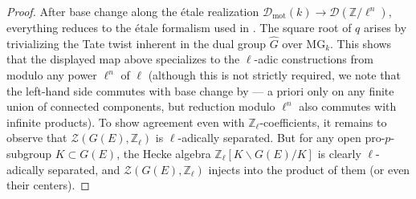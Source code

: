 \documentclass[11pt]{amsart}
\numberwithin{equation}{section}
\numberwithin{theorem}{section}
\theoremstyle{definition}
\begin{document}
\begin{proof}
After base change along the \'etale realization $\mathcal D_{\mathrm{mot}}(k)\to \mathcal D(\mathbb Z/\ell^n)$, everything reduces to the \'etale formalism used in \cite{FarguesScholze}. The square root of $q$ arises by trivializing the Tate twist inherent in the dual group $\widehat{G}$ over $\mathrm{MG}_k$. This shows that the displayed map above specializes to the $\ell$-adic constructions from \cite{FarguesScholze} modulo any power $\ell^n$ of $\ell$ (although this is not strictly required, we note that the left-hand side commutes with base change by \cite[Theorem VIII.3.6]{FarguesScholze} --- a priori only on any finite union of connected components, but reduction modulo $\ell^n$ also commutes with infinite products). To show agreement even with $\mathbb Z_\ell$-coefficients, it remains to observe that $\mathcal{Z}(G(E),\mathbb Z_\ell)$ is $\ell$-adically separated. But for any open pro-$p$-subgroup $K\subset G(E)$, the Hecke algebra $\mathbb Z_\ell[K\backslash G(E)/K]$ is clearly $\ell$-adically separated, and $\mathcal Z(G(E),\mathbb Z_\ell)$ injects into the product of them (or even their centers).
\end{proof}






\end{document}
